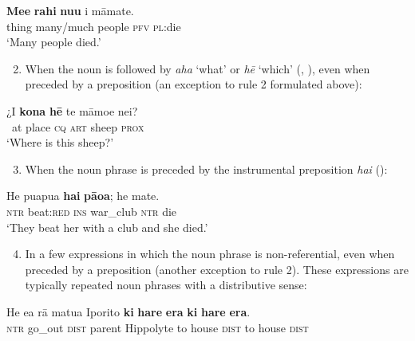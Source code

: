 \ea\label{ex:5.17}
\gll \textbf{Me{\ꞌ}e} \textbf{rahi} \textbf{nu{\ꞌ}u} i māmate. \\
thing many/much people \textsc{pfv} \textsc{pl}:die \\

\glt
‘Many people died.’ \textstyleExampleref{[R532-05.002]}
\z

\begin{enumerate}
\setcounter{enumi}{1}
\item
When the noun is followed by \textit{aha} ‘what’ or \textit{hē} ‘which’ (, ), even when preceded by a preposition (an exception to rule 2 formulated above):
\end{enumerate}

\ea\label{ex:5.18}
\gll ¿{\ꞌ}I \textbf{kona} \textbf{hē} te māmoe nei? \\
~at place \textsc{cq} \textsc{art} sheep \textsc{prox} \\

\glt
‘Where is this sheep?’ \textstyleExampleref{[R536.037]} 
\z

\begin{enumerate}
\setcounter{enumi}{2}
\item
When the noun phrase is preceded by the instrumental preposition \textit{hai} ():
\end{enumerate}

\ea\label{ex:5.19}
\gll He pu{\ꞌ}apu{\ꞌ}a \textbf{hai} \textbf{pāoa}; he mate. \\
\textsc{ntr} beat:\textsc{red} \textsc{ins} war\_club \textsc{ntr} die \\

\glt
‘They beat her with a club and she died.’ \textstyleExampleref{[Egt-01.082]}
\z

\begin{enumerate}
\setcounter{enumi}{3}
\item
In a few expressions in which the noun phrase is non-referential, even when preceded by a preposition (another exception to rule 2). These expressions are typically repeated noun phrases with a distributive sense:
\end{enumerate}

\ea\label{ex:5.20}
\gll He e{\ꞌ}a rā matu{\ꞌ}a Iporito \textbf{ki} \textbf{hare} \textbf{era} \textbf{ki} \textbf{hare} \textbf{era}. \\
\textsc{ntr} go\_out \textsc{dist} parent Hippolyte to house \textsc{dist} to house \textsc{dist} \\

